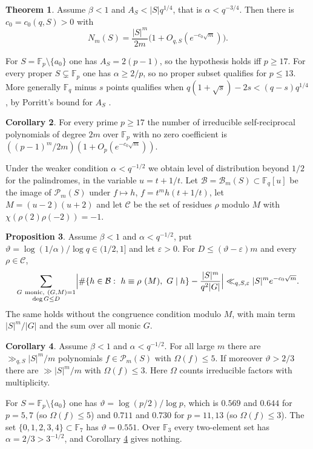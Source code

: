 \documentclass[11pt]{amsart}
\theoremstyle{definition}
\newtheorem{theorem}{Theorem}[section]
\newtheorem{proposition}[theorem]{Proposition}
\newtheorem{corollary}[theorem]{Corollary}
\newcommand{\F}{\mathbb{F}}
\newcommand{\cB}{\mathcal{B}}
\newcommand{\cP}{\mathcal{P}}
\newcommand{\cC}{\mathcal{C}}
\begin{document}
\begin{theorem}\label{thm:main}
Assume $\beta<1$ and $A_S<|S|q^{1/4}$, that is $\alpha<q^{-3/4}$. Then there is $c_0=c_0(q,S)>0$ with
\[
N_m(S)=\frac{|S|^m}{2m}\bigl(1+O_{q,S}(e^{-c_0\sqrt m})\bigr).
\]
\end{theorem}

For $S=\F_p\setminus\{a_0\}$ one has $A_S=2(p-1)$, so the hypothesis holds iff $p\ge17$. For every proper $S\subsetneq\F_p$ one has $\alpha\ge 2/p$, so no proper subset qualifies for $p\le13$. More generally $\F_q$ minus $s$ points qualifies when $q(1+\sqrt s)-2s<(q-s)q^{1/4}$, by Porritt's bound for $A_S$ \cite[Corollary 1]{Porritt}.

\begin{corollary}\label{cor:nozero}
For every prime $p\ge17$ the number of irreducible self-reciprocal polynomials of degree $2m$ over $\F_p$ with no zero coefficient is $((p-1)^m/2m)(1+O_p(e^{-c_0\sqrt m}))$.
\end{corollary}

Under the weaker condition $\alpha<q^{-1/2}$ we obtain level of distribution beyond $1/2$ for the palindromes, in the variable $u=t+1/t$. Let $\cB=\cB_m(S)\subset\F_q[u]$ be the image of $\cP_m(S)$ under $f\mapsto h$, $f=t^mh(t+1/t)$, let $M=(u-2)(u+2)$ and let $\cC$ be the set of residues $\rho$ modulo $M$ with $\chi(\rho(2)\rho(-2))=-1$.

\begin{proposition}\label{prop:level}
Assume $\beta<1$ and $\alpha<q^{-1/2}$, put $\vartheta=\log(1/\alpha)/\log q\in(1/2,1]$ and let $\varepsilon>0$. For $D\le(\vartheta-\varepsilon)m$ and every $\rho\in\cC$,
\[
\sum_{\substack{G\ \mathrm{monic},\ (G,M)=1\\ \deg G\le D}}\Bigl|\#\{h\in\cB:\ h\equiv\rho\ (M),\ G\mid h\}-\frac{|S|^m}{q^2|G|}\Bigr|\ll_{q,S,\varepsilon}|S|^me^{-c_0\sqrt m}.
\]
The same holds without the congruence condition modulo $M$, with main term $|S|^m/|G|$ and the sum over all monic $G$.
\end{proposition}

\begin{corollary}\label{cor:sieve}
Assume $\beta<1$ and $\alpha<q^{-1/2}$. For all large $m$ there are $\gg_{q,S}|S|^m/m$ polynomials $f\in\cP_m(S)$ with $\Omega(f)\le5$. If moreover $\vartheta>2/3$ there are $\gg|S|^m/m$ with $\Omega(f)\le3$. Here $\Omega$ counts irreducible factors with multiplicity.
\end{corollary}

For $S=\F_p\setminus\{a_0\}$ one has $\vartheta=\log(p/2)/\log p$, which is $0.569$ and $0.644$ for $p=5,7$ (so $\Omega(f)\le5$) and $0.711$ and $0.730$ for $p=11,13$ (so $\Omega(f)\le3$). The set $\{0,1,2,3,4\}\subset\F_7$ has $\vartheta=0.551$. Over $\F_3$ every two-element set has $\alpha=2/3>3^{-1/2}$, and Corollary \ref{cor:sieve} gives nothing.
\end{document}
